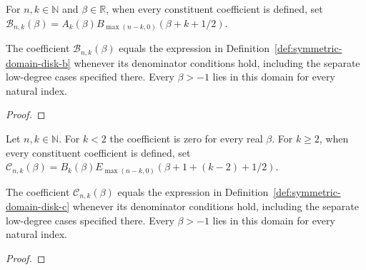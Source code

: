 \begin{supporting}
\begin{definition}
\label{def:symmetric-domain-disk-b}
\leanok
For $n,k\in\mathbb N$ and $\beta\in\mathbb R$, when every constituent coefficient is defined, set $\mathcal B_{n,k}(\beta)=A_k(\beta)B_{\max(n-k,0)}(\beta+k+1/2)$.
\end{definition}

\begin{theorem}
\label{thm:symmetric-domain-disk-b}
\leanok
The coefficient $\mathcal B_{n,k}(\beta)$ equals the expression in Definition~\ref{def:symmetric-domain-disk-b} whenever its denominator conditions hold, including the separate low-degree cases specified there.
Every $\beta>-1$ lies in this domain for every natural index.
\end{theorem}
\begin{proof}
\leanok
\end{proof}

\begin{definition}
\label{def:symmetric-domain-disk-c}
\leanok
Let $n,k\in\mathbb N$. For $k<2$ the coefficient is zero for every real $\beta$. For $k\ge2$, when every constituent coefficient is defined, set $\mathcal C_{n,k}(\beta)=B_k(\beta)E_{\max(n-k,0)}(\beta+1+(k-2)+1/2)$.
\end{definition}

\begin{theorem}
\label{thm:symmetric-domain-disk-c}
\leanok
The coefficient $\mathcal C_{n,k}(\beta)$ equals the expression in Definition~\ref{def:symmetric-domain-disk-c} whenever its denominator conditions hold, including the separate low-degree cases specified there.
Every $\beta>-1$ lies in this domain for every natural index.
\end{theorem}
\begin{proof}
\leanok
\end{proof}


\end{supporting}
